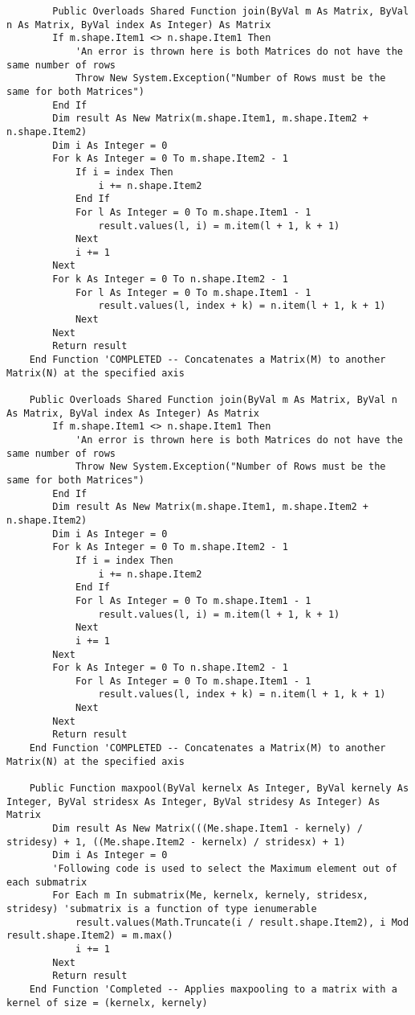 \begin{verbatim}
        Public Overloads Shared Function join(ByVal m As Matrix, ByVal n As Matrix, ByVal index As Integer) As Matrix
        If m.shape.Item1 <> n.shape.Item1 Then
            'An error is thrown here is both Matrices do not have the same number of rows
            Throw New System.Exception("Number of Rows must be the same for both Matrices")
        End If
        Dim result As New Matrix(m.shape.Item1, m.shape.Item2 + n.shape.Item2)
        Dim i As Integer = 0
        For k As Integer = 0 To m.shape.Item2 - 1
            If i = index Then
                i += n.shape.Item2
            End If
            For l As Integer = 0 To m.shape.Item1 - 1
                result.values(l, i) = m.item(l + 1, k + 1)
            Next
            i += 1
        Next
        For k As Integer = 0 To n.shape.Item2 - 1
            For l As Integer = 0 To m.shape.Item1 - 1
                result.values(l, index + k) = n.item(l + 1, k + 1)
            Next
        Next
        Return result
    End Function 'COMPLETED -- Concatenates a Matrix(M) to another Matrix(N) at the specified axis

    Public Overloads Shared Function join(ByVal m As Matrix, ByVal n As Matrix, ByVal index As Integer) As Matrix
        If m.shape.Item1 <> n.shape.Item1 Then
            'An error is thrown here is both Matrices do not have the same number of rows
            Throw New System.Exception("Number of Rows must be the same for both Matrices")
        End If
        Dim result As New Matrix(m.shape.Item1, m.shape.Item2 + n.shape.Item2)
        Dim i As Integer = 0
        For k As Integer = 0 To m.shape.Item2 - 1
            If i = index Then
                i += n.shape.Item2
            End If
            For l As Integer = 0 To m.shape.Item1 - 1
                result.values(l, i) = m.item(l + 1, k + 1)
            Next
            i += 1
        Next
        For k As Integer = 0 To n.shape.Item2 - 1
            For l As Integer = 0 To m.shape.Item1 - 1
                result.values(l, index + k) = n.item(l + 1, k + 1)
            Next
        Next
        Return result
    End Function 'COMPLETED -- Concatenates a Matrix(M) to another Matrix(N) at the specified axis
    
    Public Function maxpool(ByVal kernelx As Integer, ByVal kernely As Integer, ByVal stridesx As Integer, ByVal stridesy As Integer) As Matrix
        Dim result As New Matrix(((Me.shape.Item1 - kernely) / stridesy) + 1, ((Me.shape.Item2 - kernelx) / stridesx) + 1)
        Dim i As Integer = 0
        'Following code is used to select the Maximum element out of each submatrix
        For Each m In submatrix(Me, kernelx, kernely, stridesx, stridesy) 'submatrix is a function of type ienumerable
            result.values(Math.Truncate(i / result.shape.Item2), i Mod result.shape.Item2) = m.max()
            i += 1
        Next
        Return result
    End Function 'Completed -- Applies maxpooling to a matrix with a kernel of size = (kernelx, kernely)
    

\end{verbatim}
